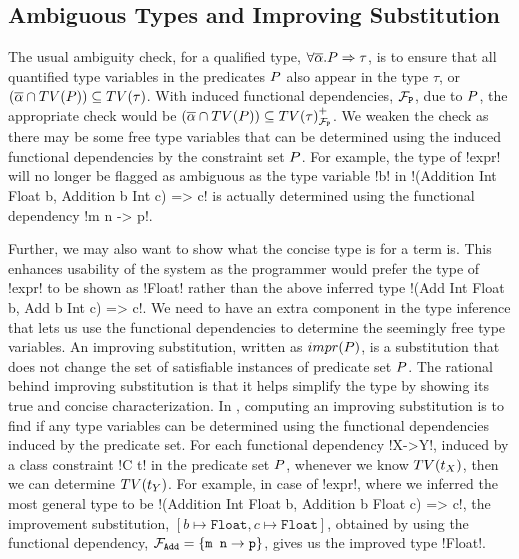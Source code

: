 \documentclass[format=acmsmall,manuscript,screen,nonacm,margin=1in,11pt]{acmart}
\begin{document}
\subsection{Ambiguous Types and Improving Substitution}\label{subsec:fd-improve}
The usual ambiguity check, for a qualified type, $\forall\overline{\alpha}.P\Rightarrow\tau$,
is to ensure that all quantified type variables in the predicates $P$ also appear in the type $\tau$,
or $(\overline{\alpha}\cap TV(P)) \subseteq TV(\tau)$. 
With induced functional dependencies, $\mathcal{F}_\texttt{P}$, due to $P$,
the appropriate check would be $(\overline{\alpha}\cap TV(P))
\subseteq {TV(\tau)}^{+}_{\mathcal{F}_\texttt{P}}$. We weaken the check
as there may be some free type variables that can be determined
using the induced functional dependencies by the constraint set $P$.
For example, the type of !expr! will no longer be flagged as ambiguous as
the type variable !b! in !(Addition Int Float b, Addition b Int c) => c! is actually
determined using the functional dependency !m n -> p!.


Further, we may also want to show what the concise type is for a term is.
This enhances usability of the system as the programmer would prefer the type of !expr!
to be shown as !Float! rather than the above inferred type !(Add Int Float b, Add b Int c) => c!.
We need to have an extra component in the type inference that lets us use
the functional dependencies to determine the seemingly free type variables.
An improving substitution, written as $impr(P)$, is a substitution that does
not change the set of satisfiable instances of predicate set $P$. 
The rational behind improving substitution is that it helps simplify
the type by showing its true and concise characterization.
In \TCFD, computing an improving substitution is to find if any type variables
can be determined using the functional dependencies induced by the predicate set.
For each functional dependency !X->Y!, induced by a class constraint !C t! in the predicate set $P$,
whenever we know $TV(t_X)$, then we can determine $TV(t_Y)$.
For example, in case of !expr!, where we inferred the most general type to be
!(Addition Int Float b, Addition b Float c) => c!,
the improvement substitution, $[b\mapsto\texttt{Float}, c\mapsto\texttt{Float}]$,
obtained by using the functional dependency, $\mathcal{F}_\texttt{Add} = \{\texttt{m n} \to \texttt{p}\}$,
gives us the improved type !Float!.
\end{document}
